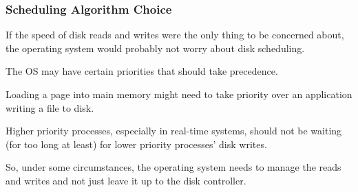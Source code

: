\begin{frame}
\frametitle{Scheduling Algorithm Choice}

If the speed of disk reads and writes were the only thing to be concerned about, the operating system would probably not worry about disk scheduling.

The OS may have certain priorities that should take precedence. 

Loading a page into main memory might need to take priority over an application writing a file to disk. 

Higher priority processes, especially in real-time systems, should not be waiting (for too long at least) for lower priority processes' disk writes. 

So, under some circumstances, the operating system needs to manage the reads and writes and not just leave it up to the disk controller.

\end{frame}



